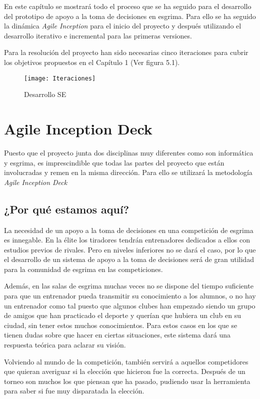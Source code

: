 En este capítulo se mostrará todo el proceso que se ha seguido para el desarrollo del prototipo
de apoyo a la toma de decisiones en esgrima. Para ello se ha seguido la dinámica \textit{Agile Inception}
para el inicio del proyecto y después utilizando el desarrollo iterativo e incremental para
las primeras versiones.

Para la resolución del proyecto han sido necesarias cinco iteraciones para cubrir
los objetivos propuestos en el Capítulo 1 (Ver figura 5.1).

\begin{figure}[htb]
  \centering
    \texttt{[image: Iteraciones]}
  \caption[Desarrollo SE]{Desarrollo SE}
  \label{fig:Desarrollo Sistema Experto}
\end{figure}

\section{Agile Inception Deck}

Puesto que el proyecto junta dos disciplinas muy diferentes como son informática y esgrima,
es imprescindible que todas las partes del proyecto que están involucradas y remen en la misma
dirección. Para ello se utilizará la metodología \textit{Agile Inception Deck}

\subsection{¿Por qué estamos aquí?}
La necesidad de un apoyo a la toma de decisiones en una competición de esgrima es innegable.
En la élite los tiradores tendrán entrenadores dedicados a ellos con estudios previos de rivales.
Pero en niveles inferiores no se dará el caso, por lo que el desarrollo de un sistema de
apoyo a la toma de decisiones será de gran utilidad para la comunidad de esgrima en las
competiciones.

Además, en las salas de esgrima muchas veces no se dispone del tiempo suficiente para que un
entrenador pueda transmitir su conocimiento a los alumnos, o no hay un entrenador como tal
puesto que algunos clubes han empezado siendo un grupo de amigos que han practicado el deporte
y querían que hubiera un club en su ciudad, sin tener estos muchos conocimientos. Para estos
casos en los que se tienen dudas sobre que hacer en ciertas situaciones, este sistema
dará una respuesta teórica para aclarar su visión.

Volviendo al mundo de la competición, también servirá a aquellos competidores que quieran
averiguar si la elección que hicieron fue la correcta. Después de un torneo son muchos
los que piensan que ha pasado, pudiendo usar la herramienta para saber si fue muy
disparatada la elección.

